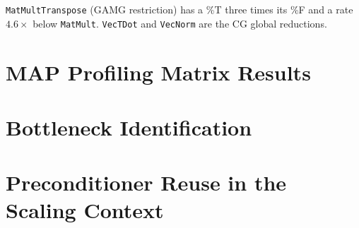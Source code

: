 \texttt{MatMultTranspose} (GAMG restriction) has a \%T three times its \%F and a rate
$4.6\times$ below \texttt{MatMult}. \texttt{VecTDot} and \texttt{VecNorm} are the CG global
reductions.

\section{MAP Profiling Matrix Results}
\label{sec:map-matrix}

\section{Bottleneck Identification}
\label{sec:bottleneck}

\section{Preconditioner Reuse in the Scaling Context}
\label{sec:pcreuse}

